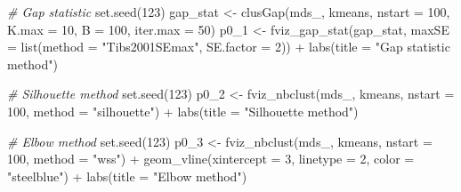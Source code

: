 \documentclass[
  11pt,
  oneside]{book}
\newenvironment{Shaded}{\begin{snugshade}}{\end{snugshade}}
\newcommand{\AttributeTok}[1]{\textcolor[rgb]{0.77,0.63,0.00}{#1}}
\newcommand{\CommentTok}[1]{\textcolor[rgb]{0.56,0.35,0.01}{\textit{#1}}}
\newcommand{\DecValTok}[1]{\textcolor[rgb]{0.00,0.00,0.81}{#1}}
\newcommand{\FunctionTok}[1]{\textcolor[rgb]{0.00,0.00,0.00}{#1}}
\newcommand{\NormalTok}[1]{#1}
\newcommand{\OtherTok}[1]{\textcolor[rgb]{0.56,0.35,0.01}{#1}}
\newcommand{\SpecialCharTok}[1]{\textcolor[rgb]{0.00,0.00,0.00}{#1}}
\newcommand{\StringTok}[1]{\textcolor[rgb]{0.31,0.60,0.02}{#1}}
\begin{document}
\begin{Shaded}
\begin{Highlighting}[]
\CommentTok{\# Gap statistic}
\FunctionTok{set.seed}\NormalTok{(}\DecValTok{123}\NormalTok{)}
\NormalTok{gap\_stat }\OtherTok{\textless{}{-}} \FunctionTok{clusGap}\NormalTok{(mds\_, kmeans, }\AttributeTok{nstart =} \DecValTok{100}\NormalTok{, }\AttributeTok{K.max =} \DecValTok{10}\NormalTok{, }\AttributeTok{B =} \DecValTok{100}\NormalTok{, }\AttributeTok{iter.max =} \DecValTok{50}\NormalTok{)}
\NormalTok{p0\_1 }\OtherTok{\textless{}{-}} \FunctionTok{fviz\_gap\_stat}\NormalTok{(gap\_stat, }\AttributeTok{maxSE =} \FunctionTok{list}\NormalTok{(}\AttributeTok{method =} \StringTok{"Tibs2001SEmax"}\NormalTok{, }\AttributeTok{SE.factor =} \DecValTok{2}\NormalTok{)) }\SpecialCharTok{+}
  \FunctionTok{labs}\NormalTok{(}\AttributeTok{title =} \StringTok{"Gap statistic method"}\NormalTok{)}

\CommentTok{\# Silhouette method}
\FunctionTok{set.seed}\NormalTok{(}\DecValTok{123}\NormalTok{)}
\NormalTok{p0\_2 }\OtherTok{\textless{}{-}} \FunctionTok{fviz\_nbclust}\NormalTok{(mds\_, kmeans, }\AttributeTok{nstart =} \DecValTok{100}\NormalTok{, }\AttributeTok{method =} \StringTok{"silhouette"}\NormalTok{) }\SpecialCharTok{+}
  \FunctionTok{labs}\NormalTok{(}\AttributeTok{title =} \StringTok{"Silhouette method"}\NormalTok{)}

\CommentTok{\# Elbow method}
\FunctionTok{set.seed}\NormalTok{(}\DecValTok{123}\NormalTok{)}
\NormalTok{p0\_3 }\OtherTok{\textless{}{-}} \FunctionTok{fviz\_nbclust}\NormalTok{(mds\_, kmeans, }\AttributeTok{nstart =} \DecValTok{100}\NormalTok{, }\AttributeTok{method =} \StringTok{"wss"}\NormalTok{) }\SpecialCharTok{+}
  \FunctionTok{geom\_vline}\NormalTok{(}\AttributeTok{xintercept =} \DecValTok{3}\NormalTok{, }\AttributeTok{linetype =} \DecValTok{2}\NormalTok{, }\AttributeTok{color =} \StringTok{"steelblue"}\NormalTok{) }\SpecialCharTok{+}
  \FunctionTok{labs}\NormalTok{(}\AttributeTok{title =} \StringTok{"Elbow method"}\NormalTok{)}
\end{Highlighting}
\end{Shaded}
\end{document}
